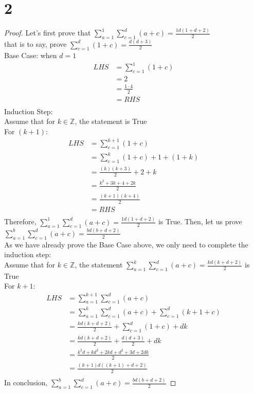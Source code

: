 \documentclass{article}
\begin{document}
\section{2}
\begin{proof}
Let's first prove that $\sum_{a=1}^1 \sum_{c=1} ^ d (a+c) = \frac{1d(1+d+2)}{2}$\\
that is to say, prove $\sum_{c=1}^d (1+c)= \frac{d(d+3)}{2}$\\
Base Case: when $d = 1$\\ 
\begin{align*}
    LHS &= \sum_{c=1}^1 (1+c)\\
    &= 2\\
    &= \frac{1 \cdot 4}{2}\\
    &= RHS\\
\end{align*}
Induction Step:\\
Assume that for $k \in \mathbb{Z}$, the statement is True\\
For $(k+1)$:\\
\begin{align*}
    LHS &= \sum_{c=1}^{k+1} (1+c) \tag{By substitution}\\
    &= \sum_{c=1}^k (1+c) + 1 + (1 + k) \tag{By algebra}\\
    &= \frac{(k)(k+3)}{2} + 2 + k \tag{By substitution}\\
    &= \frac{k^2 + 3k + 4 + 2k}{2} \\
    &= \frac{(k+1)(k+4)}{2} \tag{By algebra}\\
    &= RHS\\
\end{align*}
Therefore, $\sum_{a=1}^1 \sum_{c=1} ^ d (a+c) = \frac{1d(1+d+2)}{2}$ is True.
Then, let us prove $\sum_{a = 1}^b \sum_{c = 1} ^ d (a+c) = \frac{bd(b+d+2)}{2}$\\
As we have already prove the Base Case above, we only need to complete the induction step:\\
Assume that for $k \in \mathbb{Z}$, the statement $\sum_{a = 1}^k \sum_{c = 1} ^ d (a+c) = \frac{kd(k+d+2)}{2}$ is True\\
For $k + 1 $:
\begin{align*}
    LHS &= \sum_{a = 1}^{k+1} \sum_{c = 1} ^ d (a+c) \\
    &= \sum_{a = 1}^{k} \sum_{c = 1} ^ d (a+c) + \sum_{c=1}^d (k+1+c)\\
    &= \frac{kd(k+d+2)}{2} + \sum_{c=1}^{d}(1+c) + dk\\
    &= \frac{kd(k+d+2)}{2} + \frac{d(d+3)}{2} + dk\\
    &= \frac{k^2d + kd^2 + 2kd + d^2 + 3d + 2dk}{2}\\
    &= \frac{(k+1)d((k+1)+d+2)}{2}\\
\end{align*}
In conclusion, $\sum_{a = 1}^b \sum_{c = 1} ^ d (a+c) = \frac{bd(b+d+2)}{2}$
\end{proof}
\end{document}
